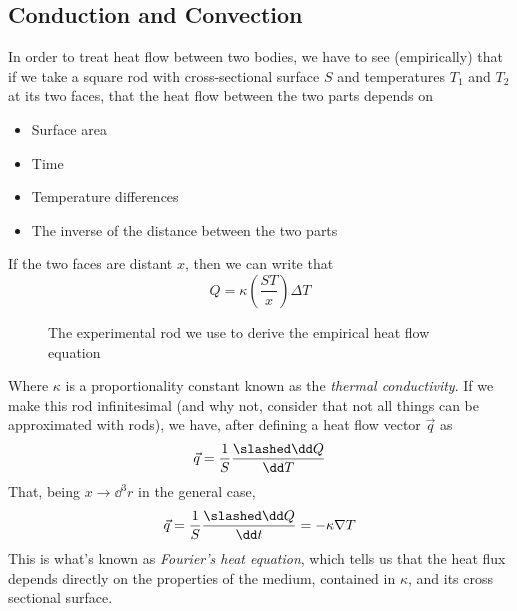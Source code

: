 \documentclass[../qm.tex]{subfiles}
\begin{document}
\subsection{Conduction and Convection}
In order to treat heat flow between two bodies, we have to see (empirically) that if we take a square rod with cross-sectional surface $S$ and temperatures $T_1$ and $T_2$ at its two faces, that the heat flow between the two parts depends on
\begin{itemize}
\item Surface area
\item Time
\item Temperature differences
\item The inverse of the distance between the two parts
\end{itemize}
If the two faces are distant $x$, then we can write that
\begin{equation}
	Q=\kappa\left( \frac{ST}{x} \right)\Delta T
	\label{eq:heat.cond}
\end{equation}
\begin{figure}[H]
	\centering
	\caption{The experimental rod we use to derive the empirical heat flow equation}
	\label{fig:rod.heat}
\end{figure}
Where $\kappa$ is a proportionality constant known as the \emph{thermal conductivity}. If we make this rod infinitesimal (and why not, consider that not all things can be approximated with rods), we have, after defining a heat flow vector $\vec{q}$ as
\begin{equation}
	\vec{q}=\frac{1}{S}\frac{\slashed\dd Q}{\dd T}
	\label{eq:heatflowvec.cond}
\end{equation}
That, being $x\to \dd^3 r$ in the general case, 
\begin{equation}
	\vec{q}=\frac{1}{S}\frac{\slashed\dd Q}{\dd t}=-\kappa\nabla T
	\label{eq:fouriereq.cond}
\end{equation}
This is what's known as \textit{Fourier's heat equation}, which tells us that the heat flux depends directly on the properties of the medium, contained in $\kappa$, and its cross sectional surface.\\
\end{document}
